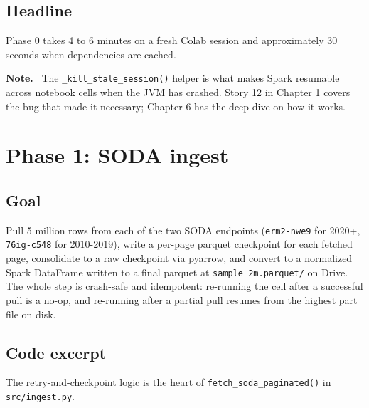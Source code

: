 \documentclass[11pt,letterpaper]{book}
\newenvironment{notebox}{\begin{framed}\textbf{Note.}~}{\end{framed}}
\begin{document}
\subsection*{Headline}

Phase 0 takes 4 to 6 minutes on a fresh Colab session and approximately 30 seconds when dependencies are cached.

\begin{notebox}
The \texttt{\_kill\_stale\_session()} helper is what makes Spark resumable across notebook cells when the JVM has crashed. Story 12 in Chapter 1 covers the bug that made it necessary; Chapter 6 has the deep dive on how it works.
\end{notebox}

\section{Phase 1: SODA ingest}
\label{sec:phase1}

\subsection*{Goal}

Pull 5 million rows from each of the two SODA endpoints (\texttt{erm2-nwe9} for 2020+, \texttt{76ig-c548} for 2010-2019), write a per-page parquet checkpoint for each fetched page, consolidate to a raw checkpoint via pyarrow, and convert to a normalized Spark DataFrame written to a final parquet at \texttt{sample\_2m.parquet/} on Drive. The whole step is crash-safe and idempotent: re-running the cell after a successful pull is a no-op, and re-running after a partial pull resumes from the highest part file on disk.

\subsection*{Code excerpt}

The retry-and-checkpoint logic is the heart of \texttt{fetch\_soda\_paginated()} in \texttt{src/ingest.py}.
\end{document}

